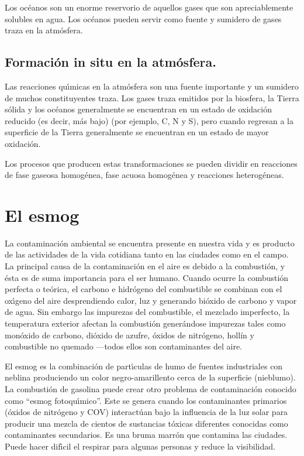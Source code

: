 Los océanos son un enorme reservorio de aquellos gases que son apreciablemente solubles en agua. Los océanos pueden servir como fuente y sumidero de gases traza en la atmósfera.

\subsection{Formación in situ en la atmósfera.}

Las reacciones qu\'{\i}micas en la atmósfera son una fuente importante y un sumidero de muchos constituyentes traza. Los gases traza emitidos por la biosfera, la Tierra sólida y los océanos generalmente se encuentran en un estado de oxidación reducido (es decir, más bajo) (por ejemplo, C, N y S), pero cuando regresan a la superficie de la Tierra generalmente se encuentran en un estado de  mayor oxidación.

Los procesos que producen estas transformaciones se pueden dividir en reacciones de fase gaseosa homogénea, fase acuosa homogénea y reacciones heterogéneas.

 \section{El esmog}
\label{sgmog}

 La contaminaci\'on ambiental se encuentra presente en nuestra vida y es producto de las actividades de la vida cotidiana tanto en las ciudades como en el campo. La principal causa de la contaminaci\'on en el aire es debido a la combusti\'on, y \'esta es de suma importancia para el ser humano. Cuando ocurre la combusti\'on perfecta o te\'orica, el carbono e hidr\'ogeno del combustible se combinan con el ox\'{\i}geno del aire desprendiendo calor, luz y generando bi\'oxido de carbono y vapor de agua. Sin embargo las impurezas del combustible, el mezclado imperfecto, la temperatura exterior afectan la combusti\'on generándose impurezas tales como mon\'oxido de carbono, di\'oxido de azufre, \'oxidos de nitr\'ogeno, holl\'in y combustible no quemado ---todos ellos son contaminantes del aire.
 
 El esmog es la combinaci\'on de part\'{\i}culas de humo de fuentes industriales con neblina produciendo un color negro-amarillento cerca de la superficie (nieblumo). La combusti\'on de gasolina puede crear otro problema de contaminaci\'on conocido como ``esmog fotoqu\'{\i}mico''. Este se genera cuando los contaminantes primarios (\'oxidos de nitr\'ogeno y COV) interact\'uan bajo la influencia de la luz solar para producir una mezcla de cientos de sustancias t\'oxicas diferentes conocidas como contaminantes secundarios. Es una bruma marr\'on que contamina las ciudades. Puede hacer dif\'{\i}cil el respirar para algunas personas y reduce la visibilidad.

